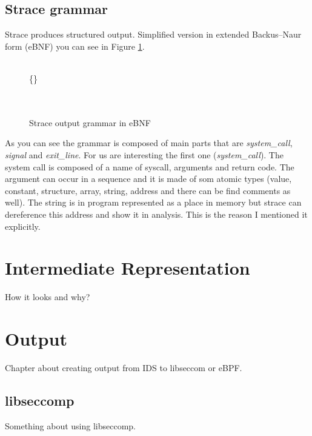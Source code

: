 \subsection{Strace grammar}
Strace produces structured output. Simplified version in extended Backus–Naur form (eBNF)\cite{ISO14977}
you can see in Figure \ref{strace_grammar_simple}.

\begin{figure}[h]
	\label{strace_grammar_simple}
	\begin{bnf*}
		{ \bnfor {} \bnfor {}}\\
		{ \bnfsp  {} \bnfsp \{\} \bnfsp {} \bnfsp {} \bnfsp {}}\\
			{ \bnfsp {} \bnfsp {}}\\
		{ \bnfsp {} \bnfsp {}}\\
	\end{bnf*}
	\caption{Strace output grammar in eBNF}
\end{figure}

As you can see the grammar is composed of main parts that are \emph{system\_call}, \emph{signal} and \emph{exit\_line}.
For us are interesting the first one (\emph{system\_call}).
The system call is composed of a name of syscall, arguments and return code.
The argument can occur in a sequence and it is made of som atomic types
(value, constant, structure, array, string, address and there can be find comments as  well).
The string is in program represented as a place in memory but strace can dereference this address
and show it in analysis. This is the reason I mentioned it explicitly.


\section{Intermediate Representation}
How it looks and why?

\section{Output}
Chapter about creating output from IDS to libseccom or eBPF.
\subsection{libseccomp}
Something about using libseccomp.
